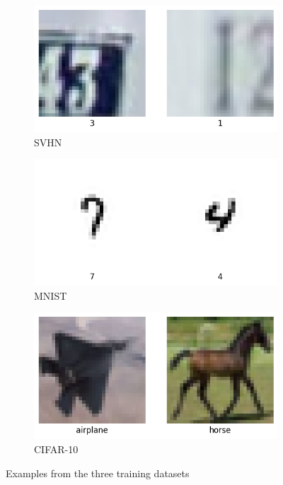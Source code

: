 \begin{figure}[h]
	\centering
	\begin{subfigure}{0.32\textwidth}
		\centering
		\includegraphics[width=\textwidth]{Bilder/svhn-examples.png}
		\caption{SVHN}
	\end{subfigure}
	\begin{subfigure}{0.32\textwidth}
		\centering
		\includegraphics[width=\textwidth]{Bilder/mnist-examples.png}
		\caption{MNIST}
	\end{subfigure}
	\begin{subfigure}{0.32\textwidth}
		\centering
		\includegraphics[width=\textwidth]{Bilder/cifar10-examples.png}
		\caption{CIFAR-10}
	\end{subfigure}
	\caption{Examples from the three training datasets}
	\label{fig:dataset-examples}
\end{figure}

